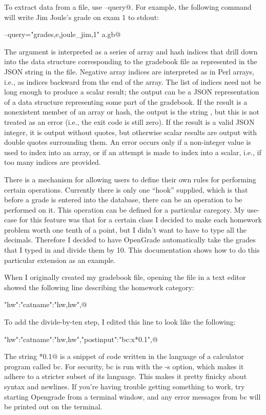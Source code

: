 \documentclass{opengrade_doc}
\begin{document}
To extract data from a file, use \verb@--query@. For example, the following
command will write
Jim Joule's grade on exam 1 to stdout:

\verb@opengrade --query="grades,e,joule_jim,1" a.gb@

The argument is interpreted as a series of array and hash indices
that drill down into the data structure corresponding to the gradebook
file as represented in the JSON string in the file. Negative array indices
are interpreted as in Perl arrays, i.e., as indices backward from the end
of the array. The list of indices need not be long enough to produce a
scalar result; the output can be a JSON representation of a data structure
representing some part of the gradebook. If the result is a nonexistent member
of an array or hash,
the output is the string \verb@null@, but this is not treated as an error
(i.e., the exit code is still zero). If the result is a valid JSON
integer, it is output without quotes, but otherwise scalar results
are output with double quotes surrounding them. An error occurs only if
a non-integer value is used to index into an array, or if an attempt
is made to index into a scalar, i.e., if too many indices are provided.

\label{extensions}
There is a mechanism for allowing users to define their own rules for
performing certain operations. Currently there is only one ``hook''
supplied, which is that before a grade is entered into the database,
there can be an operation to be performed on it. This operation
can be defined for a particular caregory. My use-case for
this feature was that for a certain class I decided to make each
homework problem worth one tenth of a point, but I didn't want to have
to type all the decimals. Therefore I decided to have OpenGrade automatically
take the grades that I typed in and divide them by 10. This documentation
shows how to do this particular extension as an example.

When I originally created my gradebook file, opening the file in
a text editor showed the following line describing the homework category:

\verb@"hw":{"catname":"hw,hw"},@

To add the divide-by-ten step, I edited this line to look like the following:

\verb@"hw":{"catname":"hw,hw","postinput":"bc:x*0.1"},@

The string \verb@x*0.1@ is a snippet of code written in the language of a
calculator program called bc. For security, bc is run with the -s option,
which makes it adhere to a stricter subset of its language. This makes it
pretty finicky about syntax and newlines. If you're having trouble getting
something to work, try starting Opengrade from a terminal window, and any
error messages from bc will be printed out on the terminal.
\end{document}
